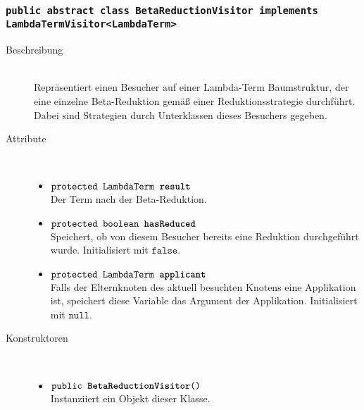 \subsubsection{\normalfont \texttt{public abstract class \textbf{BetaReductionVisitor} implements LambdaTermVisitor<LambdaTerm>}}

\begin{description}
\item[Beschreibung] \hfill \\ Repräsentiert einen Besucher auf einer Lambda-Term Baumstruktur, der eine einzelne Beta-Reduktion gemäß einer Reduktionsstrategie durchführt. Dabei sind Strategien durch Unterklassen dieses Besuchers gegeben.

\item[Attribute] \hfill \\
	\vspace{-.8cm}
	\begin{itemize}
		\item $\texttt{protected LambdaTerm \textbf{result}}$ \\ Der Term nach der Beta-Reduktion.
		\item $\texttt{protected boolean \textbf{hasReduced}}$ \\ Speichert, ob von diesem Besucher bereits eine Reduktion durchgeführt wurde. Initialisiert mit $\texttt{false}$.
		\item $\texttt{protected LambdaTerm \textbf{applicant}}$ \\ Falls der Elternknoten des aktuell besuchten Knotens eine Applikation ist, speichert diese Variable das Argument der Applikation. Initialisiert mit $\texttt{null}$.
	\end{itemize}

\item[Konstruktoren] \hfill \\
	\vspace{-.8cm}
	\begin{itemize}
		\item $\texttt{public \textbf{BetaReductionVisitor}()}$ \\ Instanziiert ein Objekt dieser Klasse.
	\end{itemize}


\end{description}
